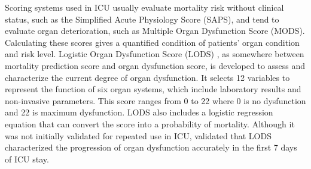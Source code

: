 \documentclass[12pt,a4paper,english
]{tunithesis}
\begin{document}
Scoring systems used in ICU usually evaluate mortality risk without clinical status, such as the Simplified Acute Physiology Score (SAPS), and tend to evaluate organ deterioration, such as Multiple Organ Dysfunction Score (MODS). Calculating these scores gives a quantified condition of patients' organ condition and risk level. Logistic Organ Dysfunction Score (LODS) \parencite{legall96}, as somewhere between mortality prediction score and organ dysfunction score, is developed to assess and characterize the current degree of organ dysfunction. \parencite{Tiffany21, Vincent2010} It selects 12 variables to represent the function of six organ systems, which include laboratory results and non-invasive parameters. This score ranges from 0 to 22 where 0 is no dysfunction and 22 is maximum dysfunction. LODS also includes a logistic regression equation that can convert the score into a probability of mortality. Although it was not initially validated for repeated use in ICU, \textcite{Timsit2002} validated that LODS characterized the progression of organ dysfunction accurately in the first 7 days of ICU stay.
\end{document}
